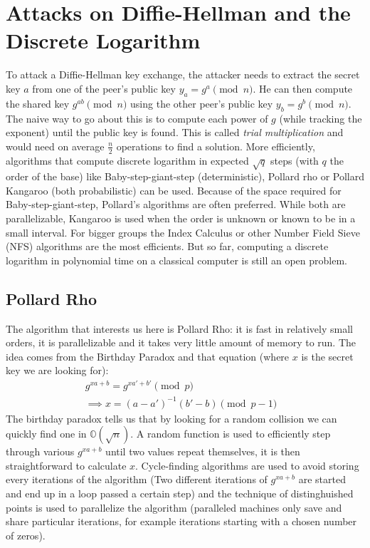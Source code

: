\documentclass[a4paper,11pt,twocolumn]{article}
\begin{document}
\section{Attacks on Diffie-Hellman and the Discrete Logarithm}

To attack a Diffie-Hellman key exchange, the attacker needs to extract the secret key $a$ from one of the peer's public key $y_a = g^a \pmod{n}$. He can then compute the shared key $g^{ab} \pmod{n}$ using the other peer's public key $y_b = g^b \pmod{n}$.\\

The naive way to go about this is to compute each power of $g$ (while tracking the exponent) until the public key is found. This is called \emph{trial multiplication} and would need on average $\frac{n}{2}$ operations to find a solution.
More efficiently, algorithms that compute discrete logarithm in expected $\sqrt{q}$ steps (with $q$ the order of the base) like Baby-step-giant-step (deterministic), Pollard rho or Pollard Kangaroo (both probabilistic) can be used. Because of the space required for Baby-step-giant-step, Pollard's algorithms are often preferred. While both are parallelizable, Kangaroo is used when the order is unknown or known to be in a small interval. For bigger groups the Index Calculus or other Number Field Sieve (NFS) algorithms are the most efficients. But so far, computing a discrete logarithm in polynomial time on a classical computer is still an open problem.\\

\subsection{Pollard Rho}

The algorithm that interests us here is Pollard Rho: it is fast in relatively small orders, it is parallelizable and it takes very little amount of memory to run. The idea comes from the Birthday Paradox and that equation (where $x$ is the secret key we are looking for):
\begin{align*}
  g^{xa +b } = g^{xa' + b'} \pmod{p}&\\
  \implies x = (a-a')^{-1} (b' - b) \pmod{p-1}&
\end{align*}
The birthday paradox tells us that by looking for a random collision we can quickly find one in $\mathbb{O}(\sqrt{n})$. A random function is used to efficiently step through various $g^{xa + b}$ until two values repeat themselves, it is then straightforward to calculate $x$. Cycle-finding algorithms are used to avoid storing every iterations of the algorithm (Two different iterations of $g^{xa+b}$ are started and end up in a loop passed a certain step) and the technique of distinghuished points is used to parallelize the algorithm (paralleled machines only save and share particular iterations, for example iterations starting with a chosen number of zeros).
\end{document}
